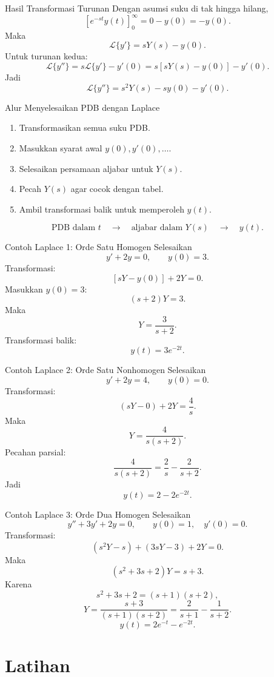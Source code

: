 \documentclass[aspectratio=169,11pt]{beamer}
\newcommand{\Lap}{\mathcal{L}}
\begin{document}
\begin{frame}{Hasil Transformasi Turunan}
Dengan asumsi suku di tak hingga hilang,
\[
\left[e^{-st}y(t)\right]_0^\infty=0-y(0)=-y(0).
\]
Maka
\[
\Lap\{y'\}=sY(s)-y(0).
\]
Untuk turunan kedua:
\[
\Lap\{y''\}=s\Lap\{y'\}-y'(0)
=s[sY(s)-y(0)]-y'(0).
\]
Jadi
\[
\boxed{\Lap\{y''\}=s^2Y(s)-sy(0)-y'(0).}
\]
\end{frame}

\begin{frame}{Alur Menyelesaikan PDB dengan Laplace}
\begin{enumerate}
  \item Transformasikan semua suku PDB.
  \item Masukkan syarat awal $y(0),y'(0),\ldots$.
  \item Selesaikan persamaan aljabar untuk $Y(s)$.
  \item Pecah $Y(s)$ agar cocok dengan tabel.
  \item Ambil transformasi balik untuk memperoleh $y(t)$.
\end{enumerate}
\[
\text{PDB dalam } t
\quad \longrightarrow \quad
\text{aljabar dalam } Y(s)
\quad \longrightarrow \quad
 y(t).
\]
\end{frame}

\begin{frame}{Contoh Laplace 1: Orde Satu Homogen}
Selesaikan
\[
y'+2y=0,\qquad y(0)=3.
\]
Transformasi:
\[
[sY-y(0)]+2Y=0.
\]
Masukkan $y(0)=3$:
\[
(s+2)Y=3.
\]
Maka
\[
Y=\frac{3}{s+2}.
\]
Transformasi balik:
\[
\boxed{y(t)=3e^{-2t}}.
\]
\end{frame}

\begin{frame}{Contoh Laplace 2: Orde Satu Nonhomogen}
Selesaikan
\[
y'+2y=4,
\qquad y(0)=0.
\]
Transformasi:
\[
(sY-0)+2Y=\frac{4}{s}.
\]
Maka
\[
Y=\frac{4}{s(s+2)}.
\]
Pecahan parsial:
\[
\frac{4}{s(s+2)}=\frac{2}{s}-\frac{2}{s+2}.
\]
Jadi
\[
\boxed{y(t)=2-2e^{-2t}}.
\]
\end{frame}

\begin{frame}{Contoh Laplace 3: Orde Dua Homogen}
Selesaikan
\[
y''+3y'+2y=0,
\qquad y(0)=1,
\quad y'(0)=0.
\]
Transformasi:
\[
(s^2Y-s)+(3sY-3)+2Y=0.
\]
Maka
\[
(s^2+3s+2)Y=s+3.
\]
Karena
\[
s^2+3s+2=(s+1)(s+2),
\]
\[
Y=\frac{s+3}{(s+1)(s+2)}=\frac{2}{s+1}-\frac{1}{s+2}.
\]
\[
\boxed{y(t)=2e^{-t}-e^{-2t}}.
\]
\end{frame}

\section{Latihan}
\end{document}
